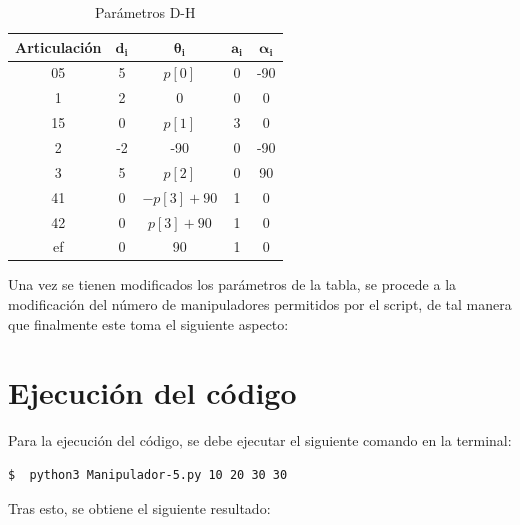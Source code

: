 \documentclass[11pt]{report}
\begin{document}
\begin{table}[htbp]
  \centering
  \caption{Parámetros D-H}
  \begin{tabular}{|c|c|c|c|c|}
      \hline
      \textbf{Articulación} & $\mathbf{d_i}$ & $\mathbf{\theta_i}$ & $\mathbf{a_i}$ & $\mathbf{\alpha_i}$ \\
      \hline
      05 & 5 & $p[0]$ & 0 & -90 \\
      1 & 2 & 0 & 0 & 0 \\
      15 & 0 & $p[1]$ & 3 & 0 \\
      2 & -2 & -90 & 0 & -90 \\
      3 & 5 & $p[2]$ & 0 & 90 \\
      41 & 0 & $-p[3] + 90$ & 1 & 0 \\
      42 & 0 & $p[3] + 90$ & 1 & 0 \\
      ef & 0 & 90 & 1 & 0 \\
      \hline
  \end{tabular}
\end{table}

Una vez se tienen modificados los parámetros de la tabla, se procede a la modificación del número de manipuladores permitidos por el script, de tal manera que finalmente este toma el siguiente aspecto:



\section{Ejecución del código}

Para la ejecución del código, se debe ejecutar el siguiente comando en la terminal:

\begin{lstlisting}[style=bash, caption={Ejecución del script de Cinemática Directa del Manipulador 5}, label=bash]
  $  python3 Manipulador-5.py 10 20 30 30
\end{lstlisting}

Tras esto, se obtiene el siguiente resultado:
\end{document}
